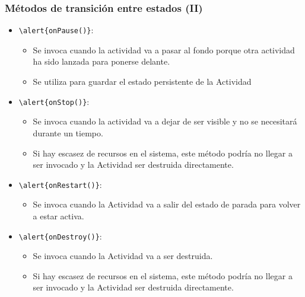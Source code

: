 \documentclass[hyperref={pdfpagelabels=true},ucs]{beamer}
\begin{document}
\begin{frame}[fragile]
\frametitle{Métodos de transición entre estados (II)}

\begin{itemize}
\item \Verb|\alert{onPause()}|:
  \begin{itemize}
  \item Se invoca cuando la actividad va a pasar al fondo porque otra
    actividad ha sido lanzada para ponerse delante.
  \item Se utiliza para guardar el estado persistente de la Actividad
  \end{itemize}

\item \Verb|\alert{onStop()}|:
  \begin{itemize}
  \item Se invoca cuando la actividad va a dejar de ser visible y no
    se necesitará durante un tiempo.
  \item Si hay escasez de recursos en el sistema, este método podría
    no llegar a ser invocado y la Actividad ser destruida
    directamente. 
  \end{itemize}

\item \Verb|\alert{onRestart()}|:
  \begin{itemize}
  \item Se invoca cuando la Actividad va a salir del estado de parada
    para volver a estar activa.
  \end{itemize}
\item \Verb|\alert{onDestroy()}|:
  \begin{itemize}
  \item Se invoca cuando la Actividad va a ser destruida.
  \item Si hay escasez de recursos en el sistema, este método podría
    no llegar a ser invocado y la Actividad ser destruida
    directamente. 
  \end{itemize}

\end{itemize}
\end{frame}
\end{document}
